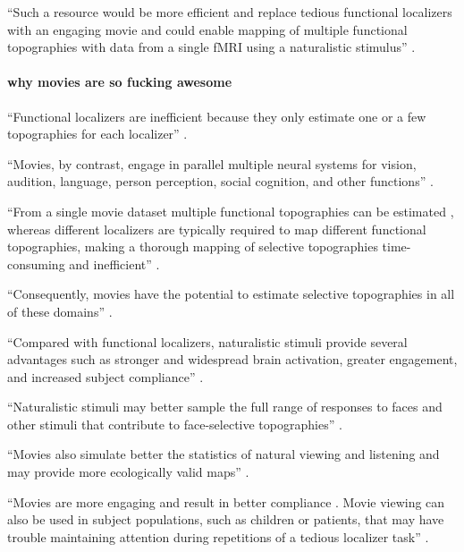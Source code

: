 %
``Such a resource would be more efficient and replace tedious functional
localizers with an engaging movie and could enable mapping of multiple
functional topographies with data from a single fMRI using a naturalistic
stimulus'' \citep{jiahui2020predicting}.


\paragraph{why movies are so fucking awesome}

%
``Functional localizers are inefficient because they only estimate one or a few
topographies for each localizer'' \citep{jiahui2020predicting}.

%
``Movies, by contrast, engage in parallel multiple neural systems for vision,
audition, language, person perception, social cognition, and other functions''
\citep{jiahui2020predicting}.

%
``From a single movie dataset multiple functional topographies can be estimated
\citep{guntupalli2016model}, whereas different localizers are typically required
to map different functional topographies, making a thorough mapping of selective
topographies time-consuming and inefficient'' \citep{jiahui2020predicting}.

%
``Consequently, movies have the potential to estimate selective topographies in
all of these domains'' \citep{jiahui2020predicting}.


``Compared with functional localizers, naturalistic stimuli provide several
advantages such as stronger and widespread brain activation, greater engagement,
and increased subject compliance'' \citep{jiahui2020predicting}.

%
``Naturalistic stimuli may better sample the full range of responses to faces
and other stimuli that contribute to face-selective topographies''
\citep{jiahui2020predicting}.

%
``Movies also simulate better the statistics of natural viewing and listening
and may provide more ecologically valid maps'' \citep{jiahui2020predicting}.

%
``Movies are more engaging and result in better compliance
\citep{vanderwal2015inscapes}.
%
Movie viewing can also be used in subject populations, such as children
\citep{richardson2018development} or patients, that may have trouble maintaining
attention during repetitions of a tedious localizer task''
\citep{jiahui2020predicting}.



